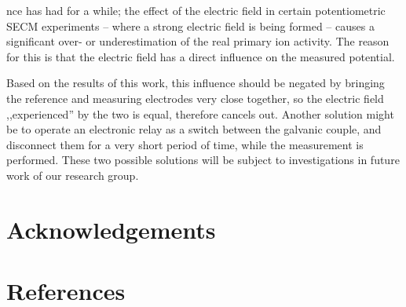 \documentclass[3p]{elsarticle}
\begin{document}
nce has had for a while; the effect of the electric field in certain potentiometric SECM experiments -- where a strong electric field is being formed -- causes a significant over- or underestimation of the real primary ion activity. The reason for this is that the electric field has a direct influence on the measured potential.

Based on the results of this work, this influence should be negated by bringing the reference and measuring electrodes very close together, so the electric field ,,experienced'' by the two is equal, therefore cancels out. Another solution might be to operate an electronic relay as a switch between the galvanic couple, and disconnect them for a very short period of time, while the measurement is performed. These two possible solutions will be subject to investigations in future work of our research group.


\section*{Acknowledgements}

\section*{References}
\end{document}
